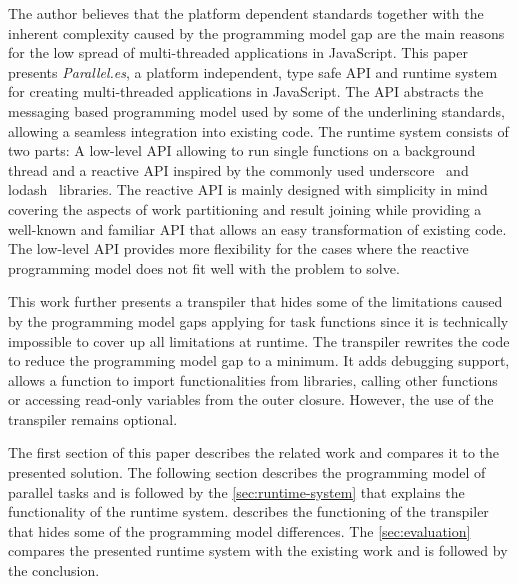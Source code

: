The author believes that the platform dependent standards together with the inherent complexity caused by the programming model gap are the main reasons for the low spread of multi-threaded applications in JavaScript. This paper presents \textit{Parallel.es}, a platform independent, type safe API and runtime system for creating multi-threaded applications in JavaScript. The API abstracts the messaging based programming model used by some of the underlining standards, allowing a seamless integration into existing code. The runtime system consists of two parts: A low-level API allowing to run single functions on a background thread and a reactive API inspired by the commonly used underscore~\cite{underscorejs} and lodash~\cite{lodash} libraries. The reactive API is mainly designed with simplicity in mind covering the aspects of work partitioning and result joining while providing a well-known and familiar API that allows an easy transformation of existing code. The low-level API provides more flexibility for the cases where the reactive programming model does not fit well with the problem to solve.

This work further presents a transpiler that hides some of the limitations caused by the programming model gaps applying for task functions since it is technically impossible to cover up all limitations at runtime. The transpiler rewrites the code to reduce the programming model gap to a minimum. It adds debugging support, allows a function to import functionalities from libraries, calling other functions or accessing read-only variables from the outer closure. However, the use of the transpiler remains optional. 


The first section of this paper describes the related work and compares it to the presented solution. The following section describes the programming model of parallel tasks and is followed by the \cref{sec:runtime-system} that explains the functionality of the runtime system.  describes the functioning of the transpiler that hides some of the programming model differences. The \cref{sec:evaluation} compares the presented runtime system with the existing work and is followed by the conclusion. 